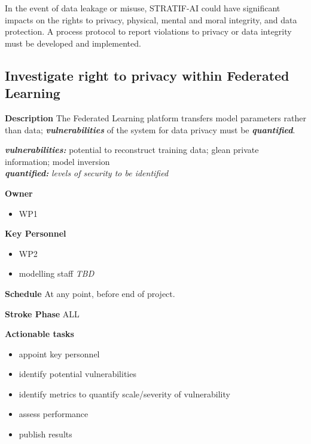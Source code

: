\documentclass[
  letterpaper,
  DIV=11,
  numbers=noendperiod]{scrreport}
\providecommand{\tightlist}{%
  \setlength{\itemsep}{0pt}\setlength{\parskip}{0pt}}\usepackage{longtable,booktabs,array}
\begin{document}
In the event of data leakage or misuse, STRATIF-AI could have
significant impacts on the rights to privacy, physical, mental and moral
integrity, and data protection. A process protocol to report violations
to privacy or data integrity must be developed and implemented.

\hypertarget{investigate-right-to-privacy-within-federated-learning}{%
\subsection{Investigate right to privacy within Federated
Learning}\label{investigate-right-to-privacy-within-federated-learning}}

\textbf{Description} The Federated Learning platform transfers model
parameters rather than data; \textbf{\emph{vulnerabilities}} of the
system for data privacy must be \textbf{\emph{quantified}}.

\textbf{\emph{vulnerabilities:}} potential to reconstruct training data;
glean private information; model inversion\\
\textbf{\emph{quantified:}} \emph{levels of security to be identified}

\textbf{Owner}

\begin{itemize}
\tightlist
\item
  WP1
\end{itemize}

\textbf{Key Personnel}

\begin{itemize}
\tightlist
\item
  WP2
\item
  modelling staff \emph{TBD}
\end{itemize}

\textbf{Schedule} At any point, before end of project.

\textbf{Stroke Phase} ALL

\textbf{Actionable tasks}

\begin{itemize}
\tightlist
\item
  appoint key personnel
\item
  identify potential vulnerabilities
\item
  identify metrics to quantify scale/severity of vulnerability
\item
  assess performance
\item
  publish results
\end{itemize}
\end{document}
